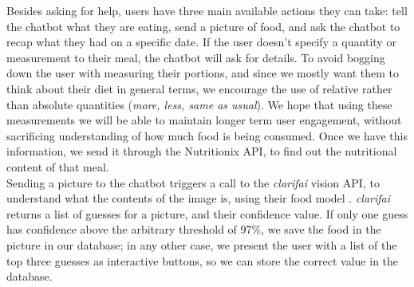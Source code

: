 Besides asking for help, users have three main available actions they can take: tell the chatbot what they are eating, send a picture of food, and ask the chatbot to recap what they had on a specific date. If the user doesn't specify a quantity or measurement to their meal, the chatbot will ask for details. To avoid bogging down the user with measuring their portions, and since we mostly want them to think about their diet in general terms, we encourage the use of relative rather than absolute quantities (\textit{more, less, same as usual}). We hope that using these measurements we will be able to maintain longer term user engagement, without sacrificing understanding of how much food is being consumed. Once we have this information, we send it through the Nutritionix API, to find out the nutritional content of that meal. \\
Sending a picture to the chatbot triggers a call to the \textit{clarifai} vision API, to understand what the contents of the image is, using their food model \cite{clarifaifood}. \textit{clarifai} returns a list of guesses for a picture, and their confidence value. If only one guess has confidence above the arbitrary threshold of 97\%, we save the food in the picture in our database; in any other case, we present the user with a list of the top three guesses as interactive buttons, so we can store the correct value in the database. \\
